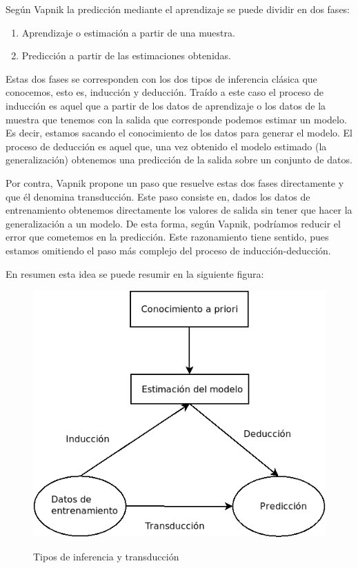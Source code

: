 Según Vapnik \cite{vapnik_v_nature_nodate} la predicción mediante el aprendizaje se puede dividir en dos fases:

\begin{enumerate}
	\item Aprendizaje o estimación a partir de una muestra.
	\item Predicción a partir de las estimaciones obtenidas.
\end{enumerate}

Estas dos fases se corresponden con los dos tipos de inferencia clásica que conocemos, esto es, inducción y deducción. Traído a este caso el proceso de inducción es aquel que a partir de los datos de aprendizaje o los datos de la muestra que tenemos con la salida que corresponde podemos estimar un modelo. Es decir, estamos sacando el conocimiento de los datos para generar el modelo. El proceso de deducción es aquel que, una vez obtenido el modelo estimado (la generalización) obtenemos una predicción de la salida sobre un conjunto de datos.

Por contra, Vapnik propone un paso que resuelve estas dos fases directamente y que él denomina transducción. Este paso consiste en, dados los datos de entrenamiento obtenemos directamente los valores de salida sin tener que hacer la generalización a un modelo. De esta forma, según Vapnik, podríamos reducir el error que cometemos en la predicción. Este razonamiento tiene sentido, pues estamos omitiendo el paso más complejo del proceso de inducción-deducción.

En resumen esta idea se puede resumir en la siguiente figura:

\begin{figure}[H]
	\centering
	\includegraphics[scale=0.5]{imagenes/induccion_deduccion_transduccion}
	\label{ind_ded_trans}
	\caption{Tipos de inferencia y transducción \cite[p.~41]{cherkassky_learning_2007}}
\end{figure}

